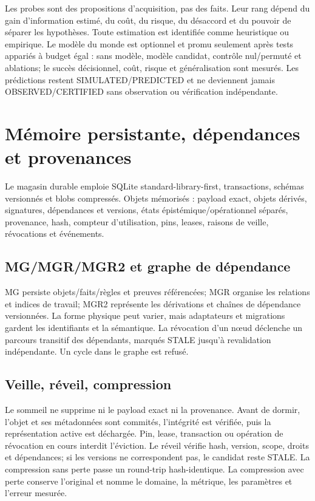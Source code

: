 \documentclass[10pt,a4paper]{article}
\begin{document}
Les probes sont des propositions d'acquisition, pas des faits. Leur rang dépend du gain d'information estimé, du coût, du risque, du désaccord et du pouvoir de séparer les hypothèses. Toute estimation est identifiée comme heuristique ou empirique. Le modèle du monde est optionnel et promu seulement après tests appariés à budget égal : sans modèle, modèle candidat, contrôle nul/permuté et ablations; le succès décisionnel, coût, risque et généralisation sont mesurés. Les prédictions restent SIMULATED/PREDICTED et ne deviennent jamais OBSERVED/CERTIFIED sans observation ou vérification indépendante.

\section{Mémoire persistante, dépendances et provenances}
Le magasin durable emploie SQLite standard-library-first, transactions, schémas versionnés et blobs compressés. Objets mémorisés : payload exact, objets dérivés, signatures, dépendances et versions, états épistémique/opérationnel séparés, provenance, hash, compteur d'utilisation, pins, leases, raisons de veille, révocations et événements.

\subsection{MG/MGR/MGR2 et graphe de dépendance}
MG persiste objets/faits/règles et preuves référencées; MGR organise les relations et indices de travail; MGR2 représente les dérivations et chaînes de dépendance versionnées. La forme physique peut varier, mais adaptateurs et migrations gardent les identifiants et la sémantique. La révocation d'un nœud déclenche un parcours transitif des dépendants, marqués STALE jusqu'à revalidation indépendante. Un cycle dans le graphe est refusé.

\subsection{Veille, réveil, compression}
Le sommeil ne supprime ni le payload exact ni la provenance. Avant de dormir, l'objet et ses métadonnées sont commités, l'intégrité est vérifiée, puis la représentation active est déchargée. Pin, lease, transaction ou opération de révocation en cours interdit l'éviction. Le réveil vérifie hash, version, scope, droits et dépendances; si les versions ne correspondent pas, le candidat reste STALE. La compression sans perte passe un round-trip hash-identique. La compression avec perte conserve l'original et nomme le domaine, la métrique, les paramètres et l'erreur mesurée.
\end{document}
